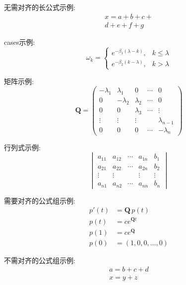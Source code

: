 \documentclass{cosart}
\begin{document}
无需对齐的长公式示例:
\begin{multline*}
x=a+b+c+\\
d+e+f+g
\end{multline*}

cases示例:
\[ \omega_k=\begin{cases}
e^{-\beta_1(\lambda-k)}, & k \leq \lambda\\
e^{-\beta_2(k-\lambda)}, & k > \lambda
\end{cases} \]

矩阵示例:
\[
\mathbf{Q}=\begin{pmatrix}
-\lambda_1 & \lambda_1 & 0 & \cdots & 0 \\
0 & -\lambda_2 & \lambda_2 & \cdots & 0 \\
0 & 0 & \lambda_3 & \cdots & \vdots \\
\vdots & \vdots & \vdots &  & \lambda_{n-1} \\
0 & 0 & 0 & \cdots & -\lambda_{n}
\end{pmatrix}
\]

行列式示例:
\[
\begin{vmatrix}
a_{11} & a_{12} & \cdots & a_{1n} & b_{1}\\
a_{21} & a_{22} & \cdots & a_{2n} & b_{2}\\
\vdots & \vdots &  & \vdots & \vdots\\
a_{n1} & a_{n2} & \cdots & a_{nn} & b_{n}
\end{vmatrix}
\]

需要对齐的公式组示例:
\begin{align*}
p'(t)&=\mathbf{Q}\,p(t)\\
p(t) &=c e^{\mathbf{Q}t}\\
p(1) &=c e^{\mathbf{Q}}\\
p(0) &=(1, 0, 0, \ldots, 0)
\end{align*}

不需对齐的公式组示例:
\begin{gather*}
a=b+c+d\\
x=y+z
\end{gather*}
\end{document}
